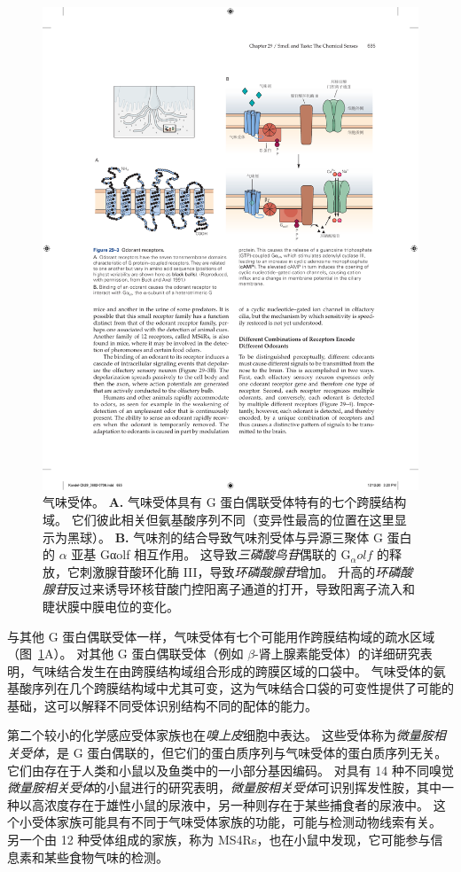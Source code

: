 \begin{figure}[htbp]
	\centering
	\includegraphics[width=0.95\linewidth]{chap29/fig_29_3}
	\caption{气味受体。
		\textbf{A.} 气味受体具有 G 蛋白偶联受体特有的七个跨膜结构域。
		它们彼此相关但氨基酸序列不同（变异性最高的位置在这里显示为黑球）。
		\textbf{B.} 气味剂的结合导致气味剂受体与异源三聚体 G 蛋白的 $ \alpha $ 亚基 Gαolf 相互作用。
		这导致\textit{三磷酸鸟苷}偶联的 G$_\alpha olf $ 的释放，它刺激腺苷酸环化酶 III，导致\textit{环磷酸腺苷}增加。
		升高的\textit{环磷酸腺苷}反过来诱导环核苷酸门控阳离子通道的打开，导致阳离子流入和睫状膜中膜电位的变化。}
	\label{fig:29_3}
\end{figure}


与其他 G 蛋白偶联受体一样，气味受体有七个可能用作跨膜结构域的疏水区域（图~\ref{fig:29_3}A）。
对其他 G 蛋白偶联受体（例如 $\beta$-肾上腺素能受体）的详细研究表明，气味结合发生在由跨膜结构域组合形成的跨膜区域的口袋中。
气味受体的氨基酸序列在几个跨膜结构域中尤其可变，这为气味结合口袋的可变性提供了可能的基础，这可以解释不同受体识别结构不同的配体的能力。


第二个较小的化学感应受体家族也在\textit{嗅上皮}细胞中表达。
这些受体称为\textit{微量胺相关受体}，是 G 蛋白偶联的，但它们的蛋白质序列与气味受体的蛋白质序列无关。 
它们由存在于人类和小鼠以及鱼类中的一小部分基因编码。
对具有 14 种不同嗅觉\textit{微量胺相关受体}的小鼠进行的研究表明，\textit{微量胺相关受体}可识别挥发性胺，其中一种以高浓度存在于雄性小鼠的尿液中，另一种则存在于某些捕食者的尿液中。
这个小受体家族可能具有不同于气味受体家族的功能，可能与检测动物线索有关。
另一个由 12 种受体组成的家族，称为 MS4Rs，也在小鼠中发现，它可能参与信息素和某些食物气味的检测。


